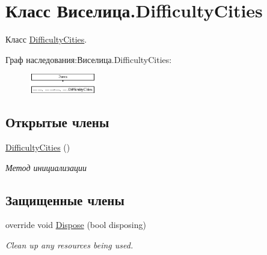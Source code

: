 \hypertarget{class_xD0_x92_xD0_xB8_xD1_x81_xD0_xB5_xD0_xBB_xD0_xB8_xD1_x86_xD0_xB0_1_1_difficulty_cities}{\section{Класс Виселица.\+Difficulty\+Cities}
\label{class_xD0_x92_xD0_xB8_xD1_x81_xD0_xB5_xD0_xBB_xD0_xB8_xD1_x86_xD0_xB0_1_1_difficulty_cities}
}


Класс \hyperlink{class_xD0_x92_xD0_xB8_xD1_x81_xD0_xB5_xD0_xBB_xD0_xB8_xD1_x86_xD0_xB0_1_1_difficulty_cities}{Difficulty\+Cities}.  


Граф наследования\+:Виселица.\+Difficulty\+Cities\+:\begin{figure}[H]
\begin{center}
\leavevmode
\includegraphics[height=0.844646cm]{class_xD0_x92_xD0_xB8_xD1_x81_xD0_xB5_xD0_xBB_xD0_xB8_xD1_x86_xD0_xB0_1_1_difficulty_cities}
\end{center}
\end{figure}
\subsection*{Открытые члены}
\begin{DoxyCompactItemize}
\item 
\hyperlink{class_xD0_x92_xD0_xB8_xD1_x81_xD0_xB5_xD0_xBB_xD0_xB8_xD1_x86_xD0_xB0_1_1_difficulty_cities_a3833a2dcaa34d4e90474a98779a0e334}{Difficulty\+Cities} ()
\begin{DoxyCompactList}\small\item\em Метод инициализации \end{DoxyCompactList}\end{DoxyCompactItemize}
\subsection*{Защищенные члены}
\begin{DoxyCompactItemize}
\item 
override void \hyperlink{class_xD0_x92_xD0_xB8_xD1_x81_xD0_xB5_xD0_xBB_xD0_xB8_xD1_x86_xD0_xB0_1_1_difficulty_cities_aed8993bc8c59e4444f7255fb2fc8e98f}{Dispose} (bool disposing)
\begin{DoxyCompactList}\small\item\em Clean up any resources being used. \end{DoxyCompactList}\end{DoxyCompactItemize}


